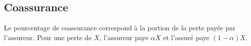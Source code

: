 \documentclass[french]{article}
\begin{document}
\begin{multicols*}{2}
\columnbreak
\subsection{Coassurance}
\begin{definitionNOHFILL}
Le pourcentage de coassurance \lfbox[formula]{$\alpha$} correspond à la portion de la perte payée par l'assureur. Pour une perte de $X$, l'assureur paye $\alpha X$ et l'assuré paye $(1 - \alpha)X$.

\begin{center}
\begin{tikzpicture}[x=0.75pt,y=0.75pt,yscale=-1,xscale=1]


\end{tikzpicture}
\end{center}
\end{definitionNOHFILL}
\end{multicols*}
\end{document}
